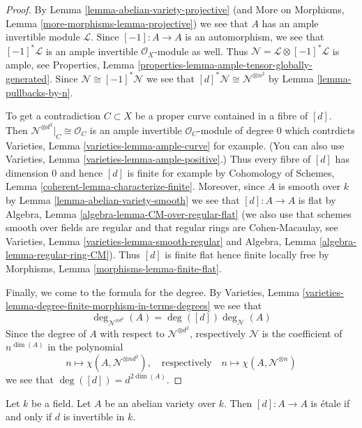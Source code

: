 \begin{proof}
By Lemma \ref{lemma-abelian-variety-projective}
(and More on Morphisms, Lemma \ref{more-morphisms-lemma-projective})
we see that $A$ has an ample invertible module $\mathcal{L}$.
Since $[-1] : A \to A$ is an automorphism, we see that
$[-1]^*\mathcal{L}$ is an ample invertible $\mathcal{O}_X$-module
as well. Thus $\mathcal{N} = \mathcal{L} \otimes [-1]^*\mathcal{L}$
is ample, see
Properties, Lemma \ref{properties-lemma-ample-tensor-globally-generated}.
Since $\mathcal{N} \cong [-1]^*\mathcal{N}$ we see that
$[d]^*\mathcal{N} \cong \mathcal{N}^{\otimes n^2}$ by
Lemma \ref{lemma-pullbacks-by-n}.

\medskip\noindent
To get a contradiction $C \subset X$ be a proper curve contained in a
fibre of $[d]$. Then $\mathcal{N}^{\otimes d^2}|_C \cong \mathcal{O}_C$
is an ample invertible $\mathcal{O}_C$-module of degree $0$ which
contrdicts Varieties, Lemma \ref{varieties-lemma-ample-curve} for example.
(You can also use Varieties, Lemma \ref{varieties-lemma-ample-positive}.)
Thus every fibre of $[d]$ has dimension $0$ and hence $[d]$ is finite
for example by Cohomology of Schemes, Lemma
\ref{coherent-lemma-characterize-finite}.
Moreover, since $A$ is smooth over $k$ by
Lemma \ref{lemma-abelian-variety-smooth}
we see that $[d] : A \to A$ is flat by
Algebra, Lemma \ref{algebra-lemma-CM-over-regular-flat}
(we also use that schemes smooth over fields are regular and that
regular rings are Cohen-Macaulay, see
Varieties, Lemma \ref{varieties-lemma-smooth-regular} and
Algebra, Lemma \ref{algebra-lemma-regular-ring-CM}).
Thus $[d]$ is finite flat hence finite locally free by
Morphisms, Lemma \ref{morphisms-lemma-finite-flat}.

\medskip\noindent
Finally, we come to the formula for the degree. By
Varieties, Lemma \ref{varieties-lemma-degree-finite-morphism-in-terms-degrees}
we see that
$$
\deg_{\mathcal{N}^{\otimes d^2}}(A) = \deg([d]) \deg_\mathcal{N}(A)
$$
Since the degree of $A$ with respect to
$\mathcal{N}^{\otimes d^2}$, respectively $\mathcal{N}$
is the coefficient of $n^{\dim(A)}$ in the polynomial
$$
n \longmapsto \chi(A, \mathcal{N}^{\otimes nd^2}),\quad
\text{respectively}\quad n \longmapsto \chi(A, \mathcal{N}^{\otimes n})
$$
we see that $\deg([d]) = d^{2 \dim(A)}$.
\end{proof}

\begin{lemma}
\label{lemma-abelian-variety-multiplication-by-d-etale}
Let $k$ be a field. Let $A$ be an abelian variety over $k$.
Then $[d] : A \to A$ is \'etale if and only if $d$ is invertible in $k$.
\end{lemma}

